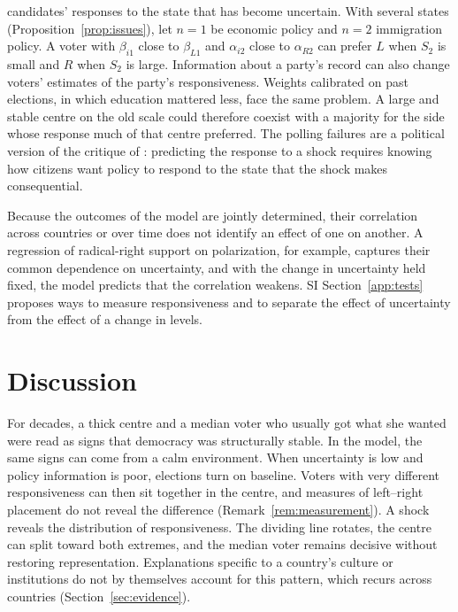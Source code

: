 \documentclass[12pt,letterpaper]{article}
\begin{document}
candidates' responses to the state that has become uncertain. With several states (Proposition~\ref{prop:issues}), let $n=1$ be economic policy and $n=2$ immigration policy. A voter with $\beta_{i1}$ close to $\beta_{L1}$ and $\alpha_{i2}$ close to $\alpha_{R2}$ can prefer $L$ when $S_2$ is small and $R$ when $S_2$ is large. Information about a party's record can also change voters' estimates of the party's responsiveness. Weights calibrated on past elections, in which education mattered less, face the same problem. A large and stable centre on the old scale could therefore coexist with a majority for the side whose response much of that centre preferred. The polling failures are a political version of the critique of \citet{Lucas1976}: predicting the response to a shock requires knowing how citizens want policy to respond to the state that the shock makes consequential.

Because the outcomes of the model are jointly determined, their correlation across countries or over time does not identify an effect of one on another. A regression of radical-right support on polarization, for example, captures their common dependence on uncertainty, and with the change in uncertainty held fixed, the model predicts that the correlation weakens. SI Section~\ref{app:tests} proposes ways to measure responsiveness and to separate the effect of uncertainty from the effect of a change in levels.

\section{Discussion}\label{sec:conclusion}

For decades, a thick centre and a median voter who usually got what she wanted were read as signs that democracy was structurally stable. In the model, the same signs can come from a calm environment. When uncertainty is low and policy information is poor, elections turn on baseline. Voters with very different responsiveness can then sit together in the centre, and measures of left--right placement do not reveal the difference (Remark~\ref{rem:measurement}). A shock reveals the distribution of responsiveness. The dividing line rotates, the centre can split toward both extremes, and the median voter remains decisive without restoring representation. Explanations specific to a country's culture or institutions do not by themselves account for this pattern, which recurs across countries (Section~\ref{sec:evidence}).
\end{document}
